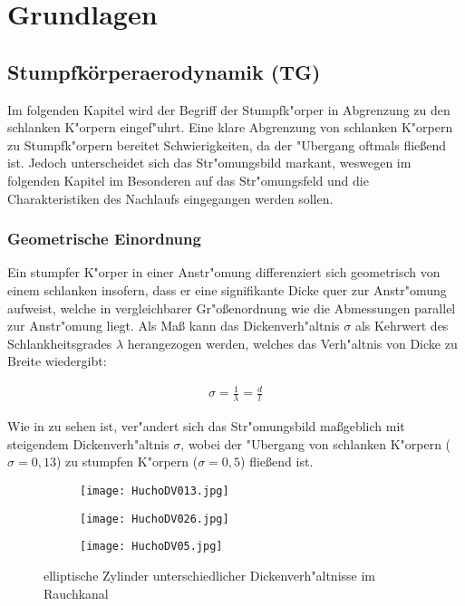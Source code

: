 \chapter{Grundlagen}\label{s:grundlagen}

\section{Stumpfk\"orperaerodynamik (TG)}


Im folgenden Kapitel wird der Begriff der Stumpfk"orper in Abgrenzung zu den schlanken K"orpern eingef"uhrt. Eine klare Abgrenzung von schlanken K"orpern zu Stumpfk"orpern bereitet Schwierigkeiten, da der "Ubergang oftmals flie\ss{}end ist. Jedoch unterscheidet sich das Str"omungsbild markant, weswegen im folgenden Kapitel im Besonderen auf das Str"omungsfeld und die Charakteristiken des Nachlaufs eingegangen werden sollen.

\subsection{Geometrische Einordnung}
\label{sec:Geometrie}
Ein stumpfer K"orper in einer Anstr"omung differenziert sich geometrisch von einem schlanken insofern, dass er eine signifikante Dicke quer zur Anstr"omung aufweist, welche in vergleichbarer Gr"o\ss{}enordnung wie die Abmessungen parallel zur Anstr"omung liegt. Als Ma\ss{} kann das Dickenverh"altnis $\sigma$ als Kehrwert des Schlankheitsgrades $\lambda$ herangezogen werden, welches das Verh"altnis von Dicke zu Breite wiedergibt:

\begin{align}
\sigma = \frac{1}{\lambda} = \frac{d}{l}
\end{align}

Wie in  zu sehen ist, ver"andert sich das Str"omungsbild ma\ss{}geblich mit steigendem Dickenverh"altnis $\sigma$, wobei der "Ubergang von schlanken K"orpern ($\sigma = 0,13$) zu stumpfen K"orpern ($\sigma = 0,5$) flie\ss{}end ist.

\begin{figure}[h]
	\centering
	\begin{subfigure}[c]{0.45\textwidth}		
		\texttt{[image: HuchoDV013.jpg]}
	\end{subfigure}
	\begin{subfigure}[c]{0.45\textwidth}
		\texttt{[image: HuchoDV026.jpg]}
	\end{subfigure}
	\begin{subfigure}[c]{0.45\textwidth}
		\texttt{[image: HuchoDV05.jpg]}
	\end{subfigure}
	\caption{elliptische Zylinder unterschiedlicher Dickenverh"altnisse im Rauchkanal \cite{Hucho.2011}}
	\label{fig:HuchoDV}
\end{figure}

